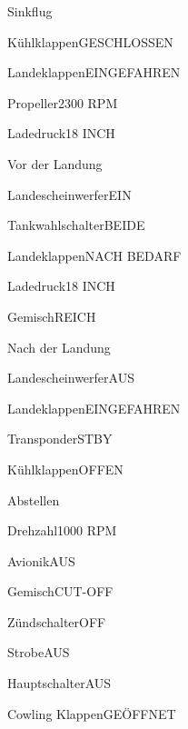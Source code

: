 \begin{memoryitem}
  \begin{checklist}{Sinkflug}
    \item{Kühlklappen}{GESCHLOSSEN}
    \item{Landeklappen}{EINGEFAHREN}
    \item{Propeller}{2300 RPM}
    \item{Ladedruck}{18 INCH}
  \end{checklist}
\end{memoryitem}

\begin{memoryitem}
  \begin{checklist}{Vor der Landung}
    \item{Landescheinwerfer}{EIN}
    \item{Tankwahlschalter}{BEIDE}
    \item{Landeklappen}{NACH BEDARF}
    \item{Ladedruck}{18 INCH}
    \item{Gemisch}{REICH}
  \end{checklist}
\end{memoryitem}

\begin{memoryitem}
  \begin{checklist}{Nach der Landung}
    \item{Landescheinwerfer}{AUS}
    \item{Landeklappen}{EINGEFAHREN}
    \item{Transponder}{STBY}
    \item{Kühlklappen}{OFFEN}
  \end{checklist}
\end{memoryitem}

\begin{memoryitem}
  \begin{checklist}{Abstellen}
    \item{Drehzahl}{1000 RPM}
    \item{Avionik}{AUS}
    \item{Gemisch}{CUT-OFF}
    \item{Zündschalter}{OFF}
    \item{Strobe}{AUS}
    \item{Hauptschalter}{AUS}
    \item{Cowling Klappen}{GEÖFFNET}
  \end{checklist}
\end{memoryitem}

